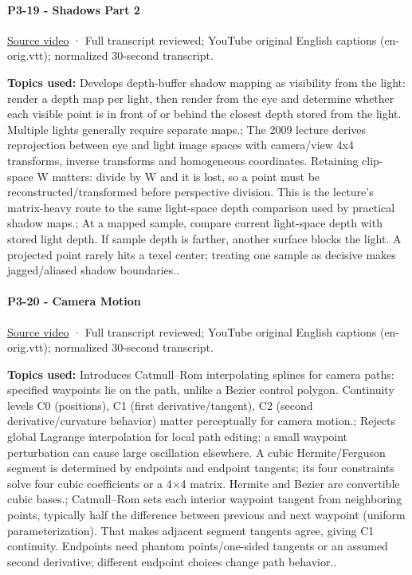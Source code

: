 \paragraph{P3-19 - Shadows Part 2}\label{p3-19---shadows-part-2}

\href{https://www.youtube.com/watch?v=qiJhB0fOY6I}{Source video} · Full transcript reviewed; YouTube original English captions (en-orig.vtt); normalized 30-second transcript.

\textbf{Topics used:} Develops depth-buffer shadow mapping as visibility from the light: render a depth map per light, then render from the eye and determine whether each visible point is in front of or behind the closest depth stored from the light. Multiple lights generally require separate maps.; The 2009 lecture derives reprojection between eye and light image spaces with camera/view 4x4 transforms, inverse transforms and homogeneous coordinates. Retaining clip-space W matters: divide by W and it is lost, so a point must be reconstructed/transformed before perspective division. This is the lecture's matrix-heavy route to the same light-space depth comparison used by practical shadow maps.; At a mapped sample, compare current light-space depth with stored light depth. If sample depth is farther, another surface blocks the light. A projected point rarely hits a texel center; treating one sample as decisive makes jagged/aliased shadow boundaries..

\paragraph{P3-20 - Camera Motion}\label{p3-20---camera-motion}

\href{https://www.youtube.com/watch?v=HAJv25Afsz8}{Source video} · Full transcript reviewed; YouTube original English captions (en-orig.vtt); normalized 30-second transcript.

\textbf{Topics used:} Introduces Catmull--Rom interpolating splines for camera paths: specified waypoints lie on the path, unlike a Bezier control polygon. Continuity levels C0 (positions), C1 (first derivative/tangent), C2 (second derivative/curvature behavior) matter perceptually for camera motion.; Rejects global Lagrange interpolation for local path editing: a small waypoint perturbation can cause large oscillation elsewhere. A cubic Hermite/Ferguson segment is determined by endpoints and endpoint tangents; its four constraints solve four cubic coefficients or a 4×4 matrix. Hermite and Bezier are convertible cubic bases.; Catmull--Rom sets each interior waypoint tangent from neighboring points, typically half the difference between previous and next waypoint (uniform parameterization). That makes adjacent segment tangents agree, giving C1 continuity. Endpoints need phantom points/one-sided tangents or an assumed second derivative; different endpoint choices change path behavior..

